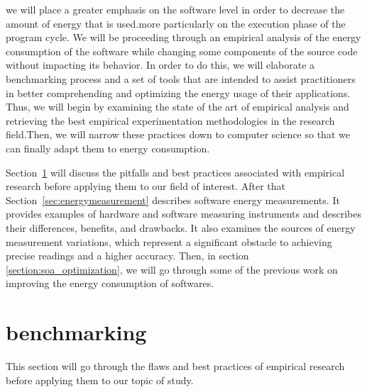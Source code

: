 we will place a greater emphasis on the software level in order to decrease the amount of energy that is used.more particularly on the execution phase of the program cycle.
We will be proceeding through an empirical analysis of the energy consumption of the software while changing some components of the source code without impacting its behavior.
In order to do this, we will elaborate a benchmarking process and a set of tools that are intended to assist practitioners in better comprehending and optimizing the energy usage of their applications.
Thus, we will begin by examining the state of the art of empirical analysis and retrieving the best empirical experimentation methodologies in the research field.Then, we will narrow these practices down to computer science so that we can finally adapt them to energy consumption.

Section~\ref{sec:soa_benchmarking} will discuss the pitfalls and best practices associated with empirical research before applying them to our field of interest.
After that Section~\ref{sec:energymeasurement} describes software energy measurements.
It provides examples of hardware and software measuring instruments and describes their differences, benefits, and drawbacks. It also examines the sources of energy measurement variations, which represent a significant obstacle to achieving precise readings and a higher accuracy.
Then, in section \ref{section:soa_optimization}, we will go through some of the previous work on improving the energy consumption of softwares.

\newpage
\section{benchmarking}\label{sec:soa_benchmarking}
This section will go through the flaws and best practices of empirical research before applying them to our topic of study.

